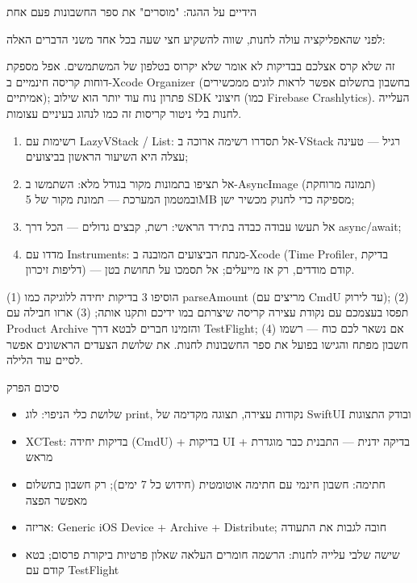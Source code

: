 \begin{tcbpractice}{הידיים על ההגה: "מוסרים" את ספר החשבונות פעם אחת}

לפני שהאפליקציה עולה לחנות, שווה להשקיע חצי שעה בכל אחד משני הדברים האלה:


זה שלא קרס אצלכם בבדיקות לא אומר שלא יקרוס בטלפון של המשתמשים. אפל מספקת דוחות קריסה חינמיים ב-Xcode Organizer (בחשבון בתשלום אפשר לראות לוגים ממכשירים אמיתיים); פתרון נוח עוד יותר הוא שילוב SDK חיצוני (כמו Firebase Crashlytics). העלייה לחנות בלי ניטור קריסות זה כמו לנהוג בעיניים עצומות.


\begin{enumerate}
  \item רשימות עם LazyVStack / List: אל תסדרו רשימה ארוכה ב-VStack רגיל — טעינה עצלה היא השיעור הראשון בביצועים;
  \item אל תציפו בתמונות מקור בגודל מלא: השתמשו ב-AsyncImage (תמונה מרוחקת) ובמטמון המערכת — תמונת מקור של 5MB מספיקה כדי לחנוק מכשיר ישן;
  \item אל תעשו עבודה כבדה בת׳רד הראשי: רשת, קבצים גדולים — הכל דרך async/await;
  \item מדדו עם Instruments: מנתח הביצועים המובנה ב-Xcode (Time Profiler, בדיקת דליפות זיכרון) — קודם מודדים, רק אז מייעלים; אל תסמכו על תחושת בטן.
\end{enumerate}

(1) הוסיפו 3 בדיקות יחידה ללוגיקה כמו parseAmount (מריצים עם CmdU עד לירוק); (2) תפסו בעצמכם עם נקודת עצירה קריסה שיצרתם במו ידיכם ותקנו אותה; (3) ארזו חבילה עם Product Archive והזמינו חברים לבטא דרך TestFlight; (4) אם נשאר לכם כוח — רשמו חשבון מפתח והגישו בפועל את ספר החשבונות לחנות. את שלושת הצעדים הראשונים אפשר לסיים עוד הלילה.

\end{tcbpractice}

\begin{tcbsummary}{סיכום הפרק}
\begin{itemize}
  \item שלושת כלי הניפוי: לוג print, נקודות עצירה, תצוגה מקדימה של SwiftUI ובודק התצוגות
  \item XCTest: בדיקות יחידה (CmdU) + בדיקות UI + בדיקה ידנית — התבנית כבר מוגדרת מראש
  \item חתימה: חשבון חינמי עם חתימה אוטומטית (חידוש כל 7 ימים); רק חשבון בתשלום מאפשר הפצה
  \item אריזה: Generic iOS Device + Archive + Distribute; חובה לגבות את התעודה
  \item שישה שלבי עלייה לחנות: הרשמה חומרים העלאה שאלון פרטיות ביקורת פרסום; בטא קודם עם TestFlight
\end{itemize}

\end{tcbsummary}
